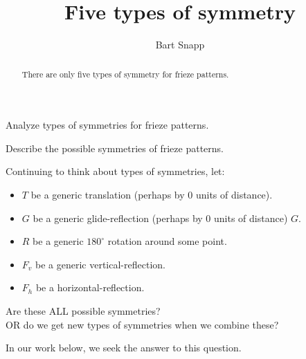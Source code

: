 \documentclass[noauthor,nooutcomes,hints,handout]{../ximera}
\author{Bart Snapp}
\title{Five types of symmetry}
\begin{document}
\begin{abstract}
  There are only five types of symmetry for frieze patterns.
\end{abstract}
\maketitle

\begin{listOutcomes}
\item Analyze types of symmetries for frieze patterns.
\item Describe the possible symmetries of frieze patterns.
\end{listOutcomes}

Continuing to think about types of symmetries, let:
\begin{itemize}
  \item $T$ be a generic translation (perhaps by $0$ units of
    distance).
  \item $G$ be a generic glide-reflection (perhaps by $0$ units of
    distance) $G$.
  \item $R$ be a generic $180^\circ$ rotation around some point.
  \item $F_v$ be a generic vertical-reflection.
  \item $F_h$ be a horizontal-reflection. 
\end{itemize}
\begin{center}
  Are these ALL possible symmetries? \\
  OR do we get new types of
symmetries when we combine these?
\end{center}
In our work below, we seek the answer to this question.




\mynewpage
\end{document}
